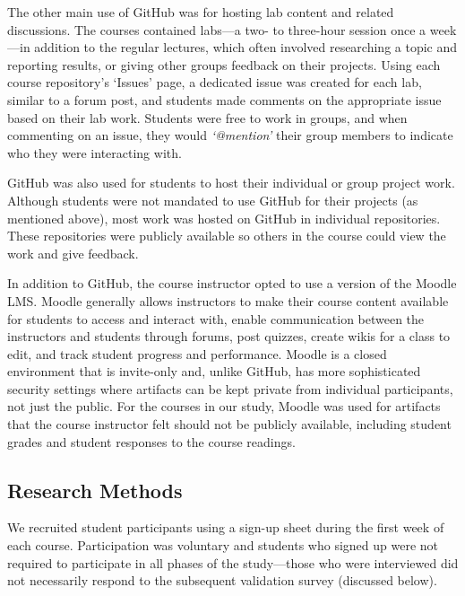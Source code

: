 The other main use of GitHub was for hosting lab content and related discussions. The courses contained labs---a two- to three-hour session once a week---in addition to the regular lectures, which often involved researching a topic and reporting results, or giving other groups feedback on their projects. Using each course repository's `Issues' page, a dedicated issue was created for each lab, similar to a forum post, and students made comments on the appropriate issue based on their lab work. Students were free to work in groups, and when commenting on an issue, they would \emph{`@mention'} their group members to indicate who they were interacting with.

GitHub was also used for students to host their individual or group project work. Although students were not mandated to use GitHub for their projects (as mentioned above), most work was hosted on GitHub in individual repositories. These repositories were publicly available so others in the course could view the work and give feedback.

In addition to GitHub, the course instructor opted to use a version of the Moodle LMS. Moodle generally allows instructors to make their course content available for students to access and interact with, enable communication between the instructors and students through forums, post quizzes, create wikis for a class to edit, and track student progress and performance. Moodle is a closed environment that is invite-only and, unlike GitHub, has more sophisticated security settings where artifacts can be kept private from individual participants, not just the public. For the courses in our study, Moodle was used for artifacts that the course instructor felt should not be publicly available, including student grades and student responses to the course readings.

\subsection{Research Methods}
We recruited student participants using a sign-up sheet during the first week of each course. Participation was voluntary and students who signed up were not required to participate in all phases of the study---those who were interviewed did not necessarily respond to the subsequent validation survey (discussed below).

